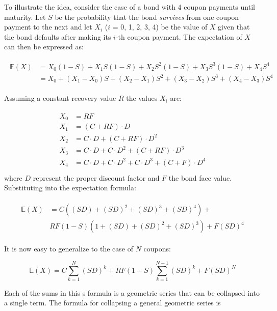 To illustrate the idea, consider the case of a bond with 4 coupon payments
until maturity. Let $S$ be the probability that the bond \emph{survives} from one
coupon payment to the next and let $X_i$ ($i$ = 0, 1, 2, 3, 4) be the value of
$X$ given that the bond defaults after making its $i$-th coupon payment. 
The expectation of $X$ can then be expressed as:

\begin{align}
\begin{split}
\mathbb{E}(X) &= X_0(1-S) + X_1 S(1-S) + X_2 S^2 (1-S) + X_3 S^3 (1-S) + X_4 S^4 \\
&= X_0 + (X_1 - X_0)S + (X_2 - X_1)S^2 + (X_3 - X_2)S^3 + (X_4 - X_3)S^4
\end{split}
\end{align}

Assuming a constant recovery value $R$ the values $X_i$ are:

\begin{align}
\begin{split}
X_0 &= RF \\
X_1 &= (C + RF)\cdot D \\
X_2 &= C\cdot D + (C + RF)\cdot D^2 \\
X_3 &= C\cdot D + C\cdot D^2 + (C + RF)\cdot D^3 \\
X_4 &= C\cdot D + C\cdot D^2 + C\cdot D^3 + (C + F)\cdot D^4 \\
\end{split}
\end{align}
where $D$ represent the proper discount factor and $F$ the bond face value.
Substituting into the expectation formula:

\begin{align}
\begin{split}
\mathbb{E}(X) &= C((SD) + (SD)^2 + (SD)^3 + (SD)^4) + \\
&RF(1-S)(1+(SD)+(SD)^2 + (SD)^3) + F(SD)^4 
\end{split}
\end{align}

It is now easy to generalize to the case of $N$ coupons:

\begin{equation} \mathbb{E}(X) = C \sum_{k=1}^{N}{(SD)^k} + RF(1-S)\sum_{k=1}^{N-1}{(SD)^k} + F(SD)^N \end{equation}

Each of the sums in this s formula is a geometric series that can be collapsed
into a single term. The formula for collapsing a general geometric series is 

